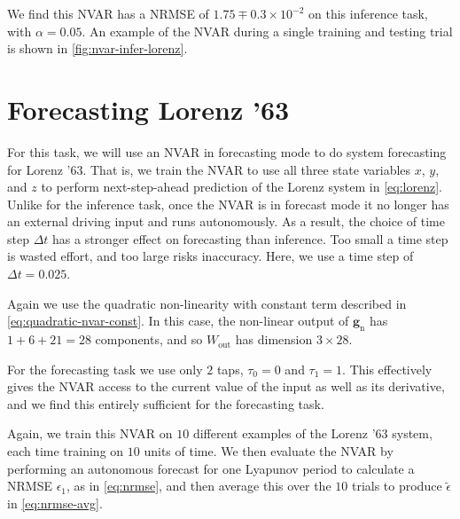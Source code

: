 We find this NVAR has a NRMSE of $1.75\mp0.3\times10^{-2}$ on this
inference task, with $\alpha = 0.05$. An example of the NVAR during a
single training and testing trial is shown in
\cref{fig:nvar-infer-lorenz}.

\section{Forecasting Lorenz '63}

For this task, we will use an NVAR in forecasting mode to do system
forecasting for Lorenz '63. That is, we train the NVAR to use all
three state variables $x$, $y$, and $z$ to perform next-step-ahead
prediction of the Lorenz system in \cref{eq:lorenz}. Unlike for the inference task, once
the NVAR is in forecast mode it no longer has an external driving
input and runs autonomously. As a result, the choice of time step
$\Delta t$ has a stronger effect on forecasting than inference. Too
small a time step is wasted effort, and too large risks
inaccuracy. Here, we use a time step of $\Delta t = 0.025$.

Again we use the quadratic non-linearity with constant term described
in \cref{eq:quadratic-nvar-const}. In this case, the non-linear output
of $\bm{g}_\text{n}$ has $1 + 6 + 21 = 28$ components, and so $W_\text{out}$ has
dimension $3 \times 28$.

For the forecasting task we use only $2$ taps, $\tau_0 = 0$ and
$\tau_1 = 1$. This effectively gives the NVAR access to the current
value of the input as well as its derivative, and we find this
entirely sufficient for the forecasting task.

Again, we train this NVAR on $10$ different examples of the Lorenz '63
system, each time training on $10$ units of time. We then evaluate the
NVAR by performing an autonomous forecast for one Lyapunov period to
calculate a NRMSE $\epsilon_1$, as in \cref{eq:nrmse}, and then
average this over the $10$ trials to produce $\tilde{\epsilon}$ in
\cref{eq:nrmse-avg}.

